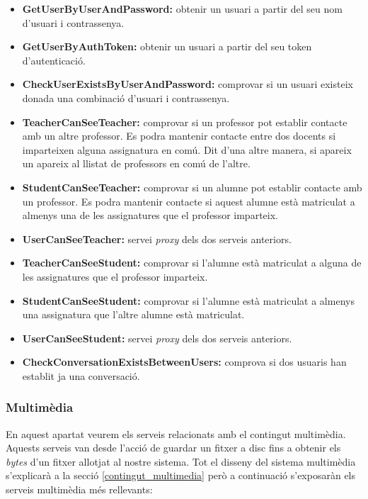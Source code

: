 		\begin{itemize}
			\item \textbf{GetUserByUserAndPassword:} obtenir un usuari a partir del seu nom d'usuari i contrassenya.
			\item \textbf{GetUserByAuthToken:} obtenir un usuari a partir del seu token d'autenticació.
			\item \textbf{CheckUserExistsByUserAndPassword:} comprovar si un usuari existeix donada una combinació d'usuari i contrassenya.
			\item \textbf{TeacherCanSeeTeacher:} comprovar si un professor pot establir contacte amb un altre professor. Es podra mantenir contacte entre dos docents si imparteixen alguna assignatura en comú. Dit d'una altre manera, si apareix un apareix al llistat de professors en comú de l'altre.
			\item \textbf{StudentCanSeeTeacher:} comprovar si un alumne pot establir contacte amb un professor. Es podra mantenir contacte si aquest alumne està matriculat a almenys una de les assignatures que el professor imparteix.
			\item \textbf{UserCanSeeTeacher:} servei \emph{proxy} dels dos serveis anteriors.
			\item \textbf{TeacherCanSeeStudent:} comprovar si l'alumne està matriculat a alguna de les assignatures que el professor imparteix.
			\item \textbf{StudentCanSeeStudent:} comprovar si l'alumne està matriculat a almenys una assignatura que l'altre alumne està matriculat.
			\item \textbf{UserCanSeeStudent:} servei \emph{proxy} dels dos serveis anteriors.
			\item \textbf{CheckConversationExistsBetweenUsers:} comprova si dos usuaris han establit ja una conversació.
			
		\end{itemize}
			
		\subsubsection{Multimèdia}
		
		En aquest apartat veurem els serveis relacionats amb el contingut multimèdia. Aquests serveis van desde l'acció de guardar un fitxer a disc fins a obtenir els \emph{bytes} d'un fitxer allotjat al nostre sistema. Tot el disseny del sistema multimèdia s'explicarà a la secció \ref{contingut_multimedia} però a continuació s'exposaràn els serveis multimèdia més rellevants:
		
